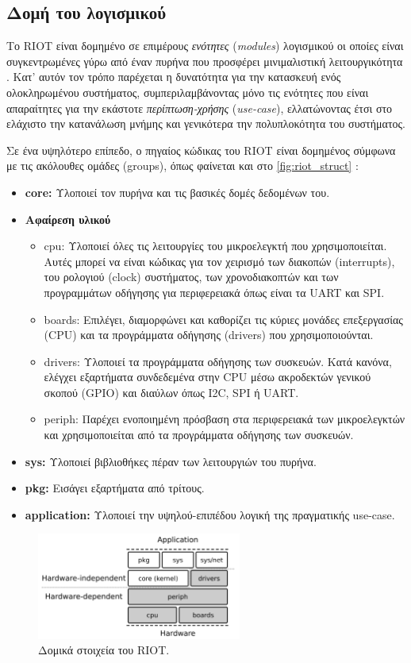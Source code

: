\subsection*{Δομή του λογισμικού}
\label{subsec:structure}

Το RIOT είναι δομημένο σε επιμέρους \textit{ενότητες} (\textit{modules}) λογισμικού οι οποίες είναι συγκεντρωμένες γύρω από έναν πυρήνα που προσφέρει μινιμαλιστική λειτουργικότητα \cite{bib:riot_new}. Κατ' αυτόν τον τρόπο παρέχεται η δυνατότητα για την κατασκευή ενός ολοκληρωμένου συστήματος, συμπεριλαμβάνοντας μόνο τις ενότητες που είναι απαραίτητες για την εκάστοτε \textit{περίπτωση-χρήσης} (\textit{use-case}), ελλατώνοντας έτσι στο ελάχιστο την κατανάλωση μνήμης και γενικότερα την πολυπλοκότητα του συστήματος.

Σε ένα υψηλότερο επίπεδο, ο πηγαίος κώδικας του RIOT είναι δομημένος σύμφωνα με τις ακόλουθες ομάδες (groups), όπως φαίνεται και στο \autoref{fig:riot_struct} \cite{bib:riot_new}:

\begin{itemize}
	\item \textbf{core:} Υλοποιεί τον πυρήνα και τις βασικές δομές δεδομένων του.
	\item \textbf{Αφαίρεση υλικού}
	\begin{itemize}
		\item cpu: Υλοποιεί όλες τις λειτουργίες του μικροελεγκτή που χρησιμοποιείται. Αυτές μπορεί να είναι κώδικας για τον χειρισμό των διακοπών (interrupts), του ρολογιού (clock) συστήματος, των χρονοδιακοπτών και των προγραμμάτων οδήγησης για περιφερειακά όπως είναι τα UART και SPI.
		\item boards: Επιλέγει, διαμορφώνει και καθορίζει τις κύριες μονάδες επεξεργασίας (CPU) και τα προγράμματα οδήγησης (drivers) που χρησιμοποιούνται.
		\item drivers: Υλοποιεί τα προγράμματα οδήγησης των συσκευών. Κατά κανόνα, ελέγχει εξαρτήματα συνδεδεμένα στην CPU μέσω ακροδεκτών γενικού σκοπού (GPIO) και διαύλων όπως I2C, SPI ή UART.
		\item periph: Παρέχει ενοποιημένη πρόσβαση στα περιφερειακά των μικροελεγκτών και χρησιμοποιείται από τα προγράμματα οδήγησης των συσκευών.
	\end{itemize}
	\item \textbf{sys:} Υλοποιεί βιβλιοθήκες πέραν των λειτουργιών του πυρήνα.
	\item \textbf{pkg:} Εισάγει εξαρτήματα από τρίτους.
	\item \textbf{application:} Υλοποιεί την υψηλού-επιπέδου λογική της πραγματικής use-case.
\end{itemize}

\begin{figure}[!ht]
	\centering
	\includegraphics[width=0.6\textwidth]{./images/chapter4/riot_struct.png}
	\caption[Λειτουργικό σύστημα RIOT.]{Δομικά στοιχεία του RIOT.}
	\label{fig:riot_struct}
\end{figure}